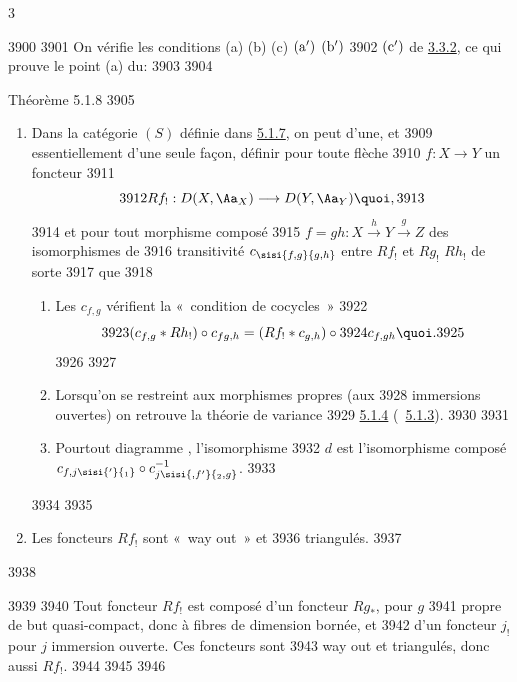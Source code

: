 3	\documentclass[10pt]{../fichiers-configuration-latex/smfart}
\begin{document}
  3900	
  3901	On vérifie les conditions (a) (b) (c) ${\rm(a')}$ ${\rm(b')}$
  3902	${\rm(c')}$ de \hyperref[XVII.prop3.3.2]{3.3.2}, ce qui prouve le point (a) du:
  3903	
  3904	\begin{enonce*}{Théorème 5.1.8}
  3905	\begin{enumerate}
  3906	\renewcommand{\theenumi}{\alph{enumi}}
  3907	\renewcommand{\labelenumi}{(\theenumi)}
  3908	\item Dans la catégorie $(S)$ définie dans \hyperref[XVII.subsubsec5.1.7]{5.1.7}, on peut d'une, et
  3909	essentiellement d'une seule façon, définir pour toute flèche
  3910	$f:X\rightarrow Y$ un foncteur
  3911	\[
  3912	Rf_{!}:D(X,\Aa_X)\longrightarrow D(Y,\Aa_Y){\quoi},
  3913	\]
  3914	et pour tout morphisme composé
  3915	$f=gh:X\xrightarrow{h}Y\xrightarrow{g}Z$ des isomorphismes de
  3916	transitivité $c_{\sisi{f,g}{g,h}}$ entre $Rf_{!}$ et $Rg_{!}$ $Rh_{!}$ de sorte
  3917	que
  3918	\begin{enumerate}
  3919	\renewcommand{\theenumii}{\roman{enumii}}
  3920	\renewcommand{\labelenumii}{(\theenumii)}
  3921	\item Les $c_{f,g}$ vérifient la « condition de cocycles »
  3922	\[
  3923	(c_{f,g}\ast Rh_{!})\circ c_{fg,h}=(Rf_{!}\ast c_{g,h})\circ
  3924	c_{f,gh}{\quoi}.
  3925	\]
  3926	
  3927	\item Lorsqu'on se restreint aux morphismes propres (\resp aux
  3928	immersions ouvertes) on retrouve la théorie de variance
  3929	\hyperref[XVII.subsubsec5.1.4]{5.1.4} (\resp~\hyperref[XVII.subsubsec5.1.3]{5.1.3}).
  3930	
  3931	\item Pour\pageoriginale tout diagramme , l'isomorphisme
  3932	$d$  est l'isomorphisme composé $c_{f,j\sisi{'}{_1}} \circ c^{-1}_{j\sisi{,f'}{_2,g}}$.
  3933	\end{enumerate}
  3934	
  3935	\item Les foncteurs $Rf_{!}$ sont « way out »  \emph{\cite[I 7]{RD}} et
  3936	triangulés.
  3937	\end{enumerate}
  3938	\end{enonce*}
  3939	
  3940	Tout foncteur $Rf_{!}$ est composé d'un foncteur $Rg_{\ast}$, pour $g$
  3941	propre de but quasi-compact, donc à fibres de dimension bornée, et
  3942	d'un foncteur $j_{!}$ pour $j$ immersion ouverte. Ces foncteurs sont
  3943	way out et triangulés, donc aussi $Rf_{!}$.
  3944	
  3945	\setcounter{subsubsection}{8}
  3946	\paragraph{}
\end{document}
